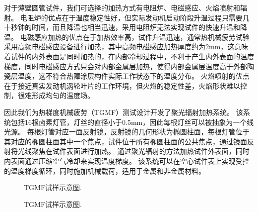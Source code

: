 \documentclass{article}
\begin{document}
对于薄壁圆管试件，我们可选择的加热方式有电阻炉、电磁感应、火焰喷射和辐射。
电阻炉的优点在于温度稳定性好，但实际发动机启动阶段升温过程只需要几十秒钟的时间，而且降温也相当迅速，采用电阻炉无法实现试件的快速升温和降温。
电磁感应加热的优点在于加热效率高，试件升温迅速，通常热机械疲劳试验采用高频电磁感应设备进行加热，其中高频电磁感应加热厚度约为2mm，这意味着试件的内外表面是同时加热的，在内部冷却过程中，不利于产生内外表面的温度梯度，同时电磁感应方式只会对内部金属层加热，使得内部金属层温度高于外部陶瓷层温度，这不符合热障涂层构件实际工作状态下的温度分布。
火焰喷射的优点在于接近真实发动机涡轮叶片的工作环境，但火焰的稳定性差，火焰形状难以控制，很难形成均匀的温度场。

因此我们为热梯度机械疲劳（TGMF）测试设计开发了聚光辐射加热系统。
该系统包括16根卤素灯管，灯丝的直径小于0.5mm，因此每根灯丝可以被抽象为一个线光源。
每根灯管对应一面反射镜，反射镜的几何形状为椭圆柱面，每根灯管位于其对应的椭圆柱面其中一个焦点，试件位于所有椭圆柱面的公共焦点，通过镜面反射将光线聚焦在试件表面进行加热。
通过聚光辐射的方法加热试件外表面，同时内表面通过压缩空气冷却来实现温度梯度。
该系统可以在空心试件表上实现受控的温度梯度循环，同时施加机械载荷，适用于金属和非金属材料。

\begin{figure}[!htp]
\caption{TGMF试样示意图.}
\label{Fig:Radiation_Furnace2}
\end{figure}

\begin{figure}[!htp]
\caption{TGMF试样示意图.}
\label{Fig:Specimen}
\end{figure}
\end{document}
